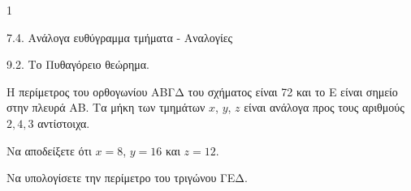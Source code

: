 \begin{ylh}{1}
    \item 7.4. Ανάλογα ευθύγραμμα τμήματα - Αναλογίες
    \item 9.2. Το Πυθαγόρειο θεώρημα.
\end{ylh}
\begin{figure} %
    \centering
\end{figure}
Η περίμετρος του ορθογωνίου ΑΒΓΔ του σχήματος είναι 72 και το Ε είναι σημείο στην πλευρά ΑΒ. Τα μήκη των τμημάτων $x$, $y$, $z$ είναι ανάλογα προς τους αριθμούς $2,4,3$ αντίστοιχα.
\begin{alist}
    \item Να αποδείξετε ότι $x = 8$, $y = 16$ και $z = 12$. 
    \item Να υπολογίσετε την περίμετρο του τριγώνου ΓΕΔ. 
\end{alist}